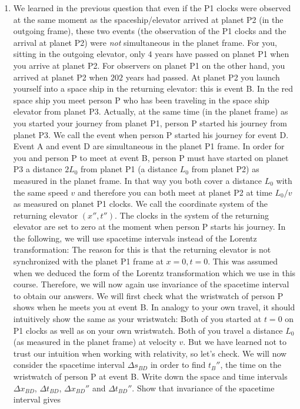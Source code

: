 {\begin{multicols}{2}
\begin{enumerate}
\item We learned in the previous question that even if the P1 clocks were observed at the same moment as the spaceship/elevator arrived at planet P2 (in the outgoing frame), these two events (the observation of the P1 clocks and the arrival at planet P2) were \emph{not} simultaneous in the planet frame. For you, sitting in the outgoing elevator, only $4$ years have passed on planet P1 when you arrive at planet P2. For observers on planet P1 on the other hand, you arrived at planet P2 when $202$ years had passed. At planet P2 you launch yourself into a space ship in the returning elevator: this is event B. In the red space ship you meet person P who has been traveling in the space ship elevator from planet P3. Actually, at the same time (in the planet frame) as you started your journey from planet P1, person P started his journey from planet P3. We call the event when person P started his journey for event D. Event A and event D are simultaneous in the planet P1 frame. In order for you and person P to meet at event B, person P must have started on planet P3 a distance $2L_0$ from planet P1 (a distance $L_0$ from planet P2) as measured in the planet frame. In that way you both cover a distance $L_0$ with the same speed $v$ and therefore you can both meet at planet P2 at time $L_0/v$ as measured on planet P1 clocks. We call the coordinate system of the returning elevator $(x'',t'')$. The clocks in the system of the returning elevator are set to zero at the moment when person P starts his journey. In the following, we will use spacetime intervals instead of the Lorentz transformation: The reason for this is that the returning elevator is not synchronized with the planet P1 frame at $x=0,t=0$. This was assumed when we deduced the form of the Lorentz transformation which we use in this course. Therefore, we will now again use invariance of the spacetime interval to obtain our answers. We will first check what the wristwatch of person P shows when he meets you at event B. In analogy to your own travel, it should intuitively show the same as your wristwatch: Both of you started at $t=0$ on P1 clocks as well as on your own wristwatch. Both of you travel a distance $L_0$ (as measured in the planet frame) at velocity $v$. But we have learned not to trust our intuition when working with relativity, so let's check. We will now consider the spacetime interval $\Delta s_{BD}$ in order to find $t_B''$, the time on the wristwatch of person P at event B. Write down the space and time intervals $\Delta x_{BD}$, $\Delta t_{BD}$, $\Delta x_{BD}''$ and $\Delta t_{BD}''$. Show that invariance of the spacetime interval gives

\end{enumerate}
\end{multicols}}
